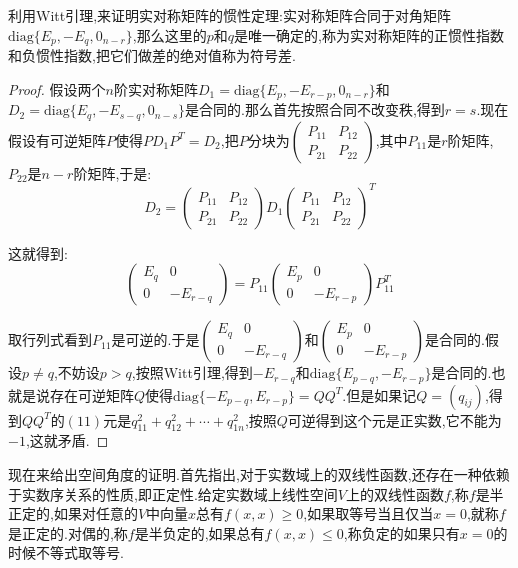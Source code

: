 利用Witt引理,来证明实对称矩阵的惯性定理:实对称矩阵合同于对角矩阵$\mathrm{diag}\{E_p,-E_q,0_{n-r}\}$,那么这里的$p$和$q$是唯一确定的,称为实对称矩阵的正惯性指数和负惯性指数,把它们做差的绝对值称为符号差.
\begin{proof}
	
	假设两个$n$阶实对称矩阵$D_1=\mathrm{diag}\{E_p,-E_{r-p},0_ {n-r}\}$和$D_2=\mathrm{diag}\{E_q,-E_{s-q},0_{n-s}\}$是合同的.那么首先按照合同不改变秩,得到$r=s$.现在假设有可逆矩阵$P$使得$PD_1P^T=D_2$,把$P$分块为$\left(\begin{array}{cc}
	P_{11}&P_{12}\\
	P_{21}&P_{22}\end{array}\right)$,其中$P_{11}$是$r$阶矩阵,$P_{22}$是$n-r$阶矩阵,于是:
	$$D_2=\left(\begin{array}{cc}
	P_{11}&P_{12}\\
	P_{21}&P_{22}\end{array}\right)D_1\left(\begin{array}{cc}
	P_{11}&P_{12}\\
	P_{21}&P_{22}\end{array}\right)^T$$
	
	这就得到:
	$$\left(\begin{array}{cc}
	E_q&0\\
	0&-E_{r-q}\end{array}\right)=P_{11}\left(\begin{array}{cc}
	E_p&0\\
	0&-E_{r-p}\end{array}\right)P_{11}^T$$
	
	取行列式看到$P_{11}$是可逆的.于是$\left(\begin{array}{cc}
	E_q&0\\
	0&-E_{r-q}\end{array}\right)$和$\left(\begin{array}{cc}
	E_p&0\\
	0&-E_{r-p}\end{array}\right)$是合同的.假设$p\not=q$,不妨设$p>q$,按照Witt引理,得到$-E_{r-q}$和$\mathrm{diag}\{E_{p-q},-E_{r-p}\}$是合同的.也就是说存在可逆矩阵$Q$使得$\mathrm{diag}\{-E_{p-q},E_{r-p}\}=QQ^T$.但是如果记$Q=(q_{ij})$,得到$QQ^T$的$(11)$元是$q_{11}^2+q_{12}^2+\cdots+q_{1n}^2$,按照$Q$可逆得到这个元是正实数,它不能为$-1$,这就矛盾.
	
\end{proof}

现在来给出空间角度的证明.首先指出,对于实数域上的双线性函数,还存在一种依赖于实数序关系的性质,即正定性.给定实数域上线性空间$V$上的双线性函数$f$,称$f$是半正定的,如果对任意的$V$中向量$x$总有$f(x,x)\ge0$,如果取等号当且仅当$x=0$,就称$f$是正定的.对偶的,称$f$是半负定的,如果总有$f(x,x)\le0$,称负定的如果只有$x=0$的时候不等式取等号.

